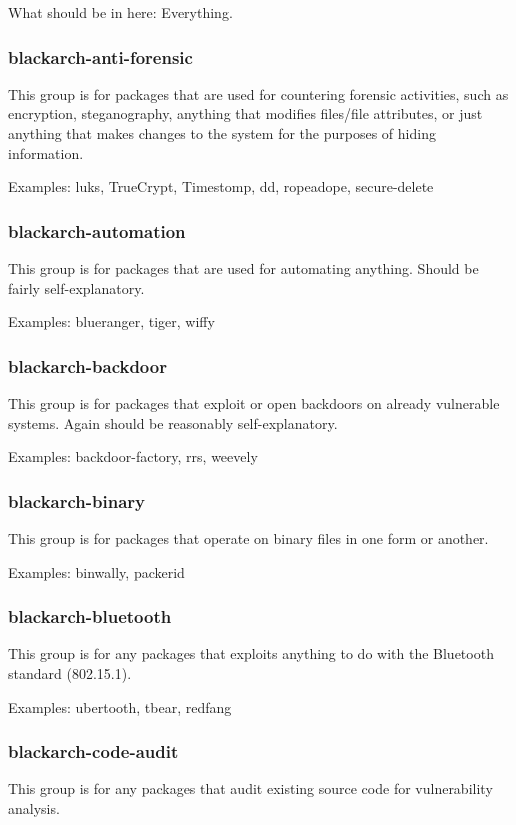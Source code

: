 \documentclass[a4paper, oneside, 11pt]{book}
\begin{document}
What should be in here: Everything.

\subsubsection{blackarch-anti-forensic}
This group is for packages that are used for countering forensic activities,
such as encryption, steganography, anything that modifies files/file attributes,
or just anything that makes changes to the system for the purposes of hiding
information.

Examples: luks, TrueCrypt, Timestomp, dd, ropeadope, secure-delete

\subsubsection{blackarch-automation}
This group is for packages that are used for automating anything. Should be
fairly self-explanatory.

Examples: blueranger, tiger, wiffy

\subsubsection{blackarch-backdoor}
This group is for packages that exploit or open backdoors on already vulnerable
systems. Again should be reasonably self-explanatory.

Examples: backdoor-factory, rrs, weevely

\subsubsection{blackarch-binary}
This group is for packages that operate on binary files in one form or another.

Examples: binwally, packerid

\subsubsection{blackarch-bluetooth}
This group is for any packages that exploits anything to do with the Bluetooth
standard (802.15.1).

Examples: ubertooth, tbear, redfang

\subsubsection{blackarch-code-audit}
This group is for any packages that audit existing source code for vulnerability
analysis.
\end{document}
